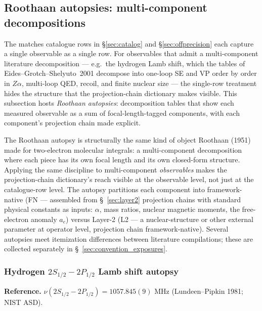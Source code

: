 \documentclass[11pt]{article}
\begin{document}
\subsection{Roothaan autopsies: multi-component decompositions}
\label{sec:autopsies}

The matches catalogue rows in \S\ref{sec:catalog} and
\S\ref{sec:offprecision} each capture a single observable as a
single row.  For observables that admit a multi-component literature
decomposition --- e.g.\ the hydrogen Lamb shift, which the tables of
Eides--Grotch--Shelyuto~2001 decompose into one-loop SE and VP order by
order in $Z\alpha$, multi-loop QED, recoil, and finite nuclear
size --- the single-row treatment hides the structure
that the projection-chain dictionary makes visible.  This subsection
hosts \emph{Roothaan autopsies}: decomposition tables that show each
measured observable as a sum of focal-length-tagged components, with
each component's projection chain made explicit.

The Roothaan autopsy is structurally the same kind of object Roothaan
(1951) made for two-electron molecular integrals: a multi-component
decomposition where each piece has its own focal length and its own
closed-form structure.  Applying the same discipline to multi-component
\emph{observables} makes the projection-chain dictionary's reach
visible at the observable level, not just at the catalogue-row level.
The autopsy partitions each component into framework-native (FN ---
assembled from \S~\ref{sec:layer2} projection chains with standard
physical constants as inputs: $\alpha$, mass ratios, nuclear magnetic
moments, the free-electron anomaly $a_e$) versus Layer-2 (L2 ---
a nuclear-structure or other external parameter at operator level,
projection chain framework-native).  Several autopsies meet
itemization differences between literature compilations; these are
collected separately in \S~\ref{sec:convention_exposures}.

\subsubsection{Hydrogen $2S_{1/2}-2P_{1/2}$ Lamb shift autopsy}
\label{sec:autopsy_lamb}

\textbf{Reference.} $\nu(2S_{1/2} - 2P_{1/2}) = 1057.845(9)$ MHz
(Lundeen--Pipkin 1981; NIST ASD).
\end{document}
